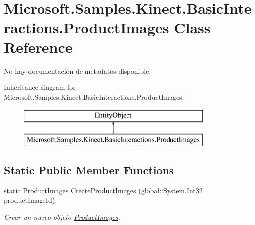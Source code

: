 \hypertarget{class_microsoft_1_1_samples_1_1_kinect_1_1_basic_interactions_1_1_product_images}{\section{Microsoft.\-Samples.\-Kinect.\-Basic\-Interactions.\-Product\-Images Class Reference}
\label{class_microsoft_1_1_samples_1_1_kinect_1_1_basic_interactions_1_1_product_images}
}


No hay documentación de metadatos disponible.  


Inheritance diagram for Microsoft.\-Samples.\-Kinect.\-Basic\-Interactions.\-Product\-Images\-:\begin{figure}[H]
\begin{center}
\leavevmode
\includegraphics[height=2.000000cm]{class_microsoft_1_1_samples_1_1_kinect_1_1_basic_interactions_1_1_product_images}
\end{center}
\end{figure}
\subsection*{Static Public Member Functions}
\begin{DoxyCompactItemize}
\item 
static \hyperlink{class_microsoft_1_1_samples_1_1_kinect_1_1_basic_interactions_1_1_product_images}{Product\-Images} \hyperlink{class_microsoft_1_1_samples_1_1_kinect_1_1_basic_interactions_1_1_product_images_aa7d55404d007d70788b41c2e220cd501}{Create\-Product\-Images} (global\-::\-System.\-Int32 product\-Image\-Id)
\begin{DoxyCompactList}\small\item\em Crear un nuevo objeto \hyperlink{class_microsoft_1_1_samples_1_1_kinect_1_1_basic_interactions_1_1_product_images}{Product\-Images}. \end{DoxyCompactList}\end{DoxyCompactItemize}
